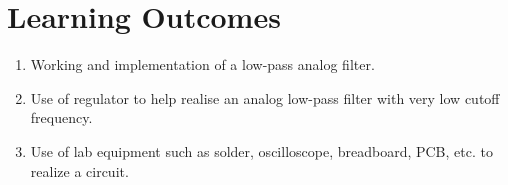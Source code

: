 \documentclass[journal,12pt,twocolumn]{IEEEtran}
\begin{document}
\section{Learning Outcomes}
\begin{enumerate}
    \item Working and implementation of a low-pass analog filter.
    \item Use of regulator to help realise an analog low-pass filter with
        very low cutoff frequency.
    \item Use of lab equipment such as solder, oscilloscope, breadboard, PCB, etc.
        to realize a circuit.
\end{enumerate}
\end{document}
